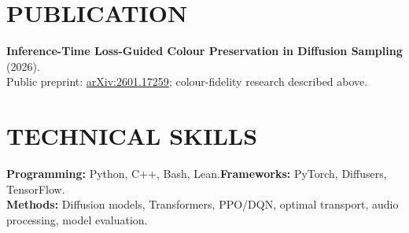 \documentclass[10pt,a4paper]{article}
\begin{document}
\section{PUBLICATION}
\textbf{Inference-Time Loss-Guided Colour Preservation in Diffusion Sampling} (2026).\\
Public preprint: \href{https://arxiv.org/abs/2601.17259}{arXiv:2601.17259}; colour-fidelity research described above.
\section{TECHNICAL SKILLS}
\textbf{Programming:} Python, C++, Bash, Lean.\quad \textbf{Frameworks:} PyTorch, Diffusers, TensorFlow.\\\textbf{Methods:} Diffusion models, Transformers, PPO/DQN, optimal transport, audio processing, model evaluation.
\end{document}
